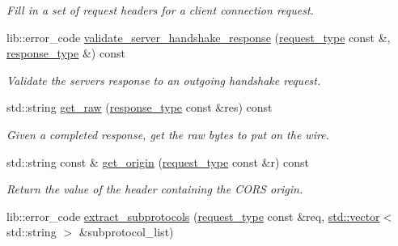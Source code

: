 \begin{DoxyCompactItemize}
\begin{DoxyCompactList}\small\item\em Fill in a set of request headers for a client connection request. \end{DoxyCompactList}\item 
lib\+::error\+\_\+code \mbox{\hyperlink{classwebsocketpp_1_1processor_1_1hybi00_a8c7e9edc5eec497d908095ab7a848f2e}{validate\+\_\+server\+\_\+handshake\+\_\+response}} (\mbox{\hyperlink{classwebsocketpp_1_1http_1_1parser_1_1request}{request\+\_\+type}} const \&, \mbox{\hyperlink{classwebsocketpp_1_1http_1_1parser_1_1response}{response\+\_\+type}} \&) const
\begin{DoxyCompactList}\small\item\em Validate the server\textquotesingle{}s response to an outgoing handshake request. \end{DoxyCompactList}\item 
\mbox{\label{classwebsocketpp_1_1processor_1_1hybi00_a100419fa981b2f464a9e102594b9e124}} 
std\+::string \mbox{\hyperlink{classwebsocketpp_1_1processor_1_1hybi00_a100419fa981b2f464a9e102594b9e124}{get\+\_\+raw}} (\mbox{\hyperlink{classwebsocketpp_1_1http_1_1parser_1_1response}{response\+\_\+type}} const \&res) const
\begin{DoxyCompactList}\small\item\em Given a completed response, get the raw bytes to put on the wire. \end{DoxyCompactList}\item 
\mbox{\label{classwebsocketpp_1_1processor_1_1hybi00_a6b52aa5ad8d93a153859545550ce41fc}} 
std\+::string const  \& \mbox{\hyperlink{classwebsocketpp_1_1processor_1_1hybi00_a6b52aa5ad8d93a153859545550ce41fc}{get\+\_\+origin}} (\mbox{\hyperlink{classwebsocketpp_1_1http_1_1parser_1_1request}{request\+\_\+type}} const \&r) const
\begin{DoxyCompactList}\small\item\em Return the value of the header containing the C\+O\+RS origin. \end{DoxyCompactList}\item 
lib\+::error\+\_\+code \mbox{\hyperlink{classwebsocketpp_1_1processor_1_1hybi00_ab7b5ff7d3a174454404fe97314ed4717}{extract\+\_\+subprotocols}} (\mbox{\hyperlink{classwebsocketpp_1_1http_1_1parser_1_1request}{request\+\_\+type}} const \&req, \mbox{\hyperlink{classstd_1_1vector}{std\+::vector}}$<$ std\+::string $>$ \&subprotocol\+\_\+list)

\end{DoxyCompactItemize}
